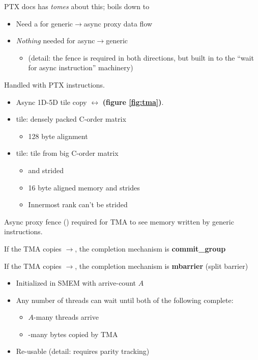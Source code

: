 \filbreak
PTX docs has \textit{tomes} about this; boils down to
\begin{itemize}
  \item Need a  for generic$\to$async proxy data flow
  \item \textit{Nothing} needed for async$\to$generic
  \begin{itemize}
    \item (detail: the fence is required in both directions, but built in to the ``wait for async instruction'' machinery)
  \end{itemize}
\end{itemize}

\filbreak
{}
Handled with  PTX instructions.

\begin{itemize}
\item Async 1D-5D tile copy $\leftrightarrow$ \textbf{(figure \ref{fig:tma})}.
\item {} tile: densely packed C-order matrix
\begin{itemize}
  \item 128 byte alignment
\end{itemize}
\item {} tile: tile from big C-order matrix
\begin{itemize}
  \item {} and strided
  \item 16 byte aligned memory and strides
  \item Innermost rank can't be strided
\end{itemize}
\end{itemize}

\filbreak
{} Async proxy fence () required for TMA to see memory written by generic instructions.

\filbreak
{}

\filbreak
If the TMA copies $\to$, the completion mechanism is \textbf{commit\_group}

\filbreak
If the TMA copies $\to$, the completion mechanism is \textbf{mbarrier} (split barrier)

\filbreak
\begin{itemize}
  \item Initialized in SMEM with arrive-count $A$
  \item Any number of threads can wait until both of the following complete:
  \begin{itemize}
    \item $A$-many threads arrive
    \item {}-many bytes copied by TMA
  \end{itemize}
  \item Re-usable (detail: requires parity tracking)
\end{itemize}

